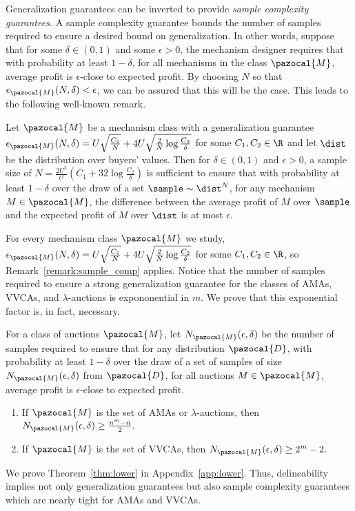 Generalization guarantees can be inverted to provide \emph{sample complexity guarantees.} A sample complexity guarantee bounds the number of samples required to ensure a desired bound on generalization. In other words, suppose that for some $\delta \in (0,1)$ and some $\epsilon >0$, the mechanism designer requires that with probability at least $1-\delta$, for all mechanisms in the class $\pazocal{M}$, average profit is $\epsilon$-close to expected profit. By choosing $N$ so that $\epsilon_{\pazocal{M}}(N, \delta) < \epsilon$, we can be assured that this will be the case. This leads to the following well-known remark.

\begin{remark}\label{remark:sample_comp}
Let $\pazocal{M}$ be a mechanism class with a generalization guarantee $\epsilon_{\pazocal{M}}(N, \delta) = U\sqrt{\frac{C_1}{N}} + 4U\sqrt{\frac{2}{N}\log\frac{C_2}{\delta}}$ for some $C_1, C_2 \in \R$ and let $\dist$ be the distribution over buyers' values. Then for $\delta \in (0,1)$ and $\epsilon > 0$, a sample size of
$N = \frac{2U^2}{\epsilon^2}\left(C_1 + 32\log\frac{C_2}{\delta}\right)$ is sufficient to ensure that with probability at least $1-\delta$ over the draw of a set $\sample \sim \dist^N$, for any mechanism $M \in \pazocal{M}$, the difference between the average profit of $M$ over $\sample$ and the expected profit of $M$ over $\dist$ is at most $\epsilon$.
\end{remark}

For every mechanism class $\pazocal{M}$ we study, $\epsilon_{\pazocal{M}}(N, \delta) = U\sqrt{\frac{C_1}{N}} + 4U\sqrt{\frac{2}{N}\log\frac{C_2}{\delta}}$ for some $C_1, C_2 \in \R$, so Remark~\ref{remark:sample_comp} applies. Notice that the number of samples required to ensure a strong generalization guarantee for the classes of AMAs, VVCAs, and $\lambda$-auctions is expononential in $m$. We prove that this exponential factor is, in fact, necessary.

\begin{theorem}
\label{thm:lower}
For a class of auctions $\pazocal{M}$, let $N_{\pazocal{M}}(\epsilon, \delta)$ be the number of samples required to ensure that for any distribution $\pazocal{D}$, with probability at least $1-\delta$ over the draw of a set of samples of size $N_{\pazocal{M}}(\epsilon, \delta)$ from $\pazocal{D}$, for all auctions $M \in \pazocal{M}$, average profit is $\epsilon$-close to expected profit. 
\begin{enumerate}
\item If $\pazocal{M}$ is the set of AMAs or $\lambda$-auctions, then $N_{\pazocal{M}}(\epsilon, \delta) \geq \frac{n^m - n}{2}.$
\item If $\pazocal{M}$ is the set of VVCAs, then $N_{\pazocal{M}}(\epsilon, \delta) \geq 2^m - 2.$
\end{enumerate}
\end{theorem}

We prove Theorem~\ref{thm:lower} in Appendix~\ref{app:lower}.
Thus, delineability implies not only generalization guarantees but also sample complexity guarantees which are nearly tight for AMAs and VVCAs.